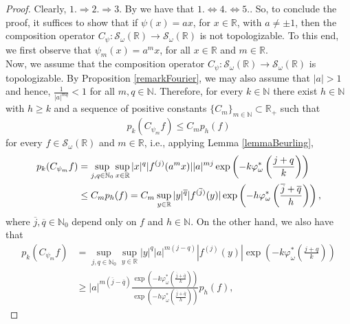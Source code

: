 \documentclass[12pt,reqno]{amsart} %
\numberwithin{equation}{section}
\begin{document}
				\begin{proof} 
					Clearly, $1.\Rightarrow 2.\Rightarrow 3.$ By \cite[Proposition 3.1]{RACSAM}  we have that $1.\Leftrightarrow 4.\Leftrightarrow 5.$. So, to conclude the proof,  it suffices to show that if $\psi(x)=a x$,  for  $x\in\mathbb{R}$, with $a\not=\pm 1$, then the composition operator $C_\psi: \mathcal{S}_{\omega}(\mathbb{R})\to \mathcal{S}_{\omega}(\mathbb{R})$ is not topologizable. To this end, we first observe that
					$\psi_m(x)=a^m x$, for all $x\in\mathbb{R}$ and $m\in\mathbb{R}$.  
				 \\
					
					
					Now, we assume that the composition operator $C_\psi: \mathcal{S}_{\omega}(\mathbb{R})\to \mathcal{S}_{\omega}(\mathbb{R})$ is topologizable. By Proposition \ref{remarkFourier}, we may also assume that $|a|>1$ and hence, $\frac{1}{|a|^{m q}}<1$ for all $m, q\in\mathbb{N}$. Therefore, 
					for every $k\in \mathbb{N}$ there exist $h\in \mathbb{N}$ with $h\geq k$ and a sequence of positive constants $\{C_m\}_{m\in\mathbb{N}}\subset \mathbb{R}_+$ such that 
					\begin{equation*}
						p_k(C_{\psi_m}f)\leq C_m p_h(f)
					\end{equation*} 
					for every $f\in \mathcal{S}_{\omega}(\mathbb{R})$ and $m\in\mathbb{R}$, i.e., applying  Lemma \ref{lemmaBeurling}, 
					\begin{align*}
						p_k(C_{\psi_m} f)
					&=\sup_{j,q\in\mathbb{N}_0}\sup_{x\in\mathbb{R}} |x|^q |f^{(j)}(a^m x)| |a|^{m j} \exp\left(-k\varphi^*_\omega\left(\frac{j+q}{k}\right)\right) \\
						& \leq C_m p_h(f)=C_m \hspace{0.02cm}\sup_{y\in\mathbb{R}} |y|^{\overline{q}} |f^{(\overline{j})}(y)| \exp\left(-h\varphi^*_\omega\left(\frac{\overline{j}+\overline{q}}{h}\right)\right), 
					\end{align*} 
					where $\overline{j}, \overline{q}\in\mathbb{N}_0$ depend only on $f$ and $h\in\mathbb{N}$. 
					On the other hand, we also have that
					\begin{align*}
							p_k(C_{\psi_m} f)
						&= \sup_{j,q\in\mathbb{N}_0} \sup_{y\in \mathbb{R}} |y|^q |a|^{m(j-q)} |f^{(j)}(y)|  \exp\left(-k\varphi^*_\omega\left(\frac{j+q}{k}\right)\right) 
						\\&\geq |a|^{m(\overline{j}-\overline{q})} \frac{\exp(-k\varphi^*_\omega(\frac{\overline{j}+\overline{q}}{k})) }{\exp(-h\varphi^*_\omega(\frac{\overline{j}+\overline{q}}{h})) } p_h(f),
					\end{align*}

\end{proof}
\end{document}
